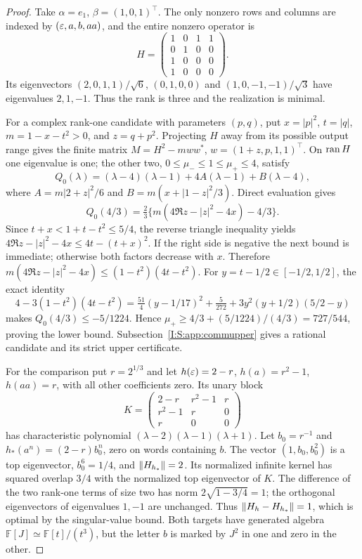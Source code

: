 \begin{proof}
Take $\alpha=e_1$, $\beta=(1,0,1)^\top$. The only nonzero rows and columns are indexed by $(\varepsilon,a,b,aa)$, and the entire nonzero operator is
\[
 H=\begin{pmatrix}1&0&1&1\\0&1&0&0\\1&0&0&0\\1&0&0&0\end{pmatrix}.
\]
Its eigenvectors $(2,0,1,1)/\sqrt6$, $(0,1,0,0)$ and $(1,0,-1,-1)/\sqrt3$ have eigenvalues $2,1,-1$. Thus the rank is three and the realization is minimal.

For a complex rank-one candidate with parameters $(p,q)$, put $x=|p|^2$, $t=|q|$, $m=1-x-t^2>0$, and $z=q+p^2$. Projecting $H$ away from its possible output range gives the finite matrix
$M=H^2-mww^*$, $w=(1+z,p,1,1)^\top$. On $\operatorname{ran} H$ one eigenvalue is one; the other two, $0\le\mu_-\le1\le\mu_+\le4$, satisfy
\[
 Q_0(\lambda)=(\lambda-4)(\lambda-1)+4A(\lambda-1)+B(\lambda-4),
\]
where $A=m|2+z|^2/6$ and $B=m(x+|1-z|^2/3)$. Direct evaluation gives
\[
 Q_0(4/3)=\tfrac23\{m(4\Re z-|z|^2-4x)-4/3\}.
\]
Since $t+x<1+t-t^2\le5/4$, the reverse triangle inequality yields
$4\Re z-|z|^2-4x\le4t-(t+x)^2$. If the right side is negative the next bound is immediate; otherwise both factors decrease with $x$. Therefore
$m(4\Re z-|z|^2-4x)\le(1-t^2)(4t-t^2)$.
For $y=t-1/2\in[-1/2,1/2]$, the exact identity
\[
 4-3(1-t^2)(4t-t^2)
 =\tfrac{51}{4}(y-1/17)^2+\tfrac5{272}
   +3y^2(y+1/2)(5/2-y)
\]
makes $Q_0(4/3)\le-5/1224$. Hence
$\mu_+\ge4/3+(5/1224)/(4/3)=727/544$, proving the lower bound. Subsection~\ref{I:S:app:commupper} gives a rational candidate and its strict upper certificate.

For the comparison put $r=2^{1/3}$ and let $h(\varepsilon)=2-r$, $h(a)=r^2-1$, $h(aa)=r$, with all other coefficients zero. Its unary block
\[
 K=\begin{pmatrix}2-r&r^2-1&r\\r^2-1&r&0\\r&0&0\end{pmatrix}
\]
has characteristic polynomial $(\lambda-2)(\lambda-1)(\lambda+1)$. Let $b_0=r^{-1}$ and $h_*(a^n)=(2-r)b_0^n$, zero on words containing $b$. The vector $(1,b_0,b_0^2)$ is a top eigenvector, $b_0^6=1/4$, and $\left\lVert H_{h_*}\right\rVert=2$. Its normalized infinite kernel has squared overlap $3/4$ with the normalized top eigenvector of $K$. The difference of the two rank-one terms of size two has norm $2\sqrt{1-3/4}=1$; the orthogonal eigenvectors of eigenvalues $1,-1$ are unchanged. Thus $\left\lVert H_h-H_{h_*}\right\rVert=1$, which is optimal by the singular-value bound. Both targets have generated algebra $\mathbb F[J]\simeq\mathbb F[t]/(t^3)$, but the letter $b$ is marked by $J^2$ in one and zero in the other.
\end{proof}
